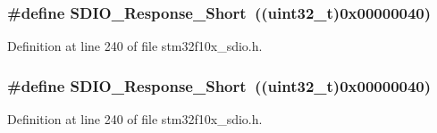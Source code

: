 \subsubsection[{\texorpdfstring{S\+D\+I\+O\+\_\+\+Response\+\_\+\+Short}{SDIO_Response_Short}}]{\setlength{\rightskip}{0pt plus 5cm}\#define S\+D\+I\+O\+\_\+\+Response\+\_\+\+Short~(({\bf uint32\+\_\+t})0x00000040)}\hypertarget{group___s_d_i_o___response___type_ga1f61768f90641648fd5c12e8d2f7e508}{}\label{group___s_d_i_o___response___type_ga1f61768f90641648fd5c12e8d2f7e508}


Definition at line 240 of file stm32f10x\+\_\+sdio.\+h.

\subsubsection[{\texorpdfstring{S\+D\+I\+O\+\_\+\+Response\+\_\+\+Short}{SDIO_Response_Short}}]{\setlength{\rightskip}{0pt plus 5cm}\#define S\+D\+I\+O\+\_\+\+Response\+\_\+\+Short~(({\bf uint32\+\_\+t})0x00000040)}\hypertarget{group___s_d_i_o___response___type_ga1f61768f90641648fd5c12e8d2f7e508}{}\label{group___s_d_i_o___response___type_ga1f61768f90641648fd5c12e8d2f7e508}


Definition at line 240 of file stm32f10x\+\_\+sdio.\+h.

